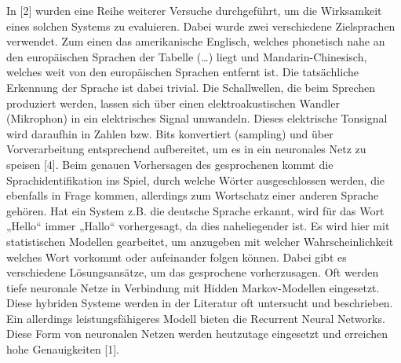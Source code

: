 In [2] wurden eine Reihe weiterer Versuche durchgeführt, um die Wirksamkeit eines solchen Systems zu evaluieren. Dabei wurde zwei verschiedene Zielsprachen verwendet. Zum einen das amerikanische Englisch, welches phonetisch nahe an den europäischen Sprachen der Tabelle (…) liegt und Mandarin-Chinesisch, welches weit von den europäischen Sprachen entfernt ist. 
Die tatsächliche Erkennung der Sprache ist dabei trivial. Die Schallwellen, die beim Sprechen produziert werden, lassen sich über einen elektroakustischen Wandler (Mikrophon) in ein elektrisches Signal umwandeln. Dieses elektrische Tonsignal wird daraufhin in Zahlen bzw. Bits konvertiert (sampling) und über Vorverarbeitung entsprechend aufbereitet, um es in ein neuronales Netz zu speisen [4]. Beim genauen Vorhersagen des gesprochenen kommt die Sprachidentifikation ins Spiel, durch welche Wörter ausgeschlossen werden, die ebenfalls in Frage kommen, allerdings zum Wortschatz einer anderen Sprache gehören. Hat ein System z.B. die deutsche Sprache erkannt, wird für das Wort „Hello“ immer „Hallo“ vorhergesagt, da dies naheliegender ist. Es wird hier mit statistischen Modellen gearbeitet, um anzugeben mit welcher Wahrscheinlichkeit welches Wort vorkommt oder aufeinander folgen können. Dabei gibt es verschiedene Lösungsansätze, um das gesprochene vorherzusagen. Oft werden tiefe neuronale Netze in Verbindung mit Hidden Markov-Modellen eingesetzt. Diese hybriden Systeme werden in der Literatur oft untersucht und beschrieben. Ein allerdings leistungsfähigeres Modell bieten die Recurrent Neural Networks. Diese Form von neuronalen Netzen werden heutzutage eingesetzt und erreichen hohe Genauigkeiten [1].


